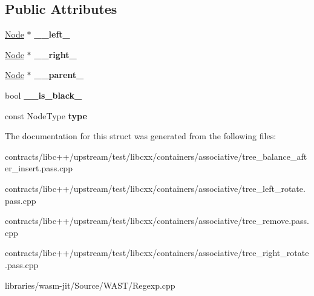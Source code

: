 \subsection*{Public Attributes}
\begin{DoxyCompactItemize}
\item 
\mbox{\label{struct_node_a307de5603bcaf79692f9f9d3472a4664}} 
\mbox{\hyperlink{struct_node}{Node}} $\ast$ {\bfseries \+\_\+\+\_\+left\+\_\+}
\item 
\mbox{\label{struct_node_a6cead8c8b044c5e6c549ced90d44d982}} 
\mbox{\hyperlink{struct_node}{Node}} $\ast$ {\bfseries \+\_\+\+\_\+right\+\_\+}
\item 
\mbox{\label{struct_node_a64a61482a6c77aed3ffa21aba9571c5a}} 
\mbox{\hyperlink{struct_node}{Node}} $\ast$ {\bfseries \+\_\+\+\_\+parent\+\_\+}
\item 
\mbox{\label{struct_node_af6b36c74e14d6cf9b8b05673df8cee7e}} 
bool {\bfseries \+\_\+\+\_\+is\+\_\+black\+\_\+}
\item 
\mbox{\label{struct_node_adf0cbf3c4ed6bcc23d4befaa861c2cc8}} 
const Node\+Type {\bfseries type}
\end{DoxyCompactItemize}


The documentation for this struct was generated from the following files\+:\begin{DoxyCompactItemize}
\item 
contracts/libc++/upstream/test/libcxx/containers/associative/tree\+\_\+balance\+\_\+after\+\_\+insert.\+pass.\+cpp\item 
contracts/libc++/upstream/test/libcxx/containers/associative/tree\+\_\+left\+\_\+rotate.\+pass.\+cpp\item 
contracts/libc++/upstream/test/libcxx/containers/associative/tree\+\_\+remove.\+pass.\+cpp\item 
contracts/libc++/upstream/test/libcxx/containers/associative/tree\+\_\+right\+\_\+rotate.\+pass.\+cpp\item 
libraries/wasm-\/jit/\+Source/\+W\+A\+S\+T/Regexp.\+cpp\end{DoxyCompactItemize}
